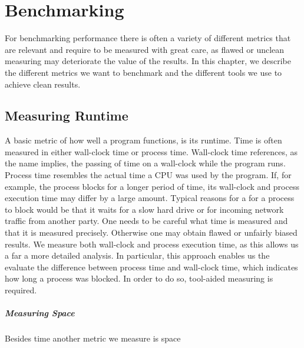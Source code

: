 \chapter{Benchmarking}
For benchmarking performance there is often a variety of different metrics that are relevant and require to be measured with great care, as flawed or unclean measuring may deteriorate the value of the results. In this chapter, we describe the different metrics we want to benchmark and the different tools we use to achieve clean results. 

\section{Measuring Runtime}
A basic metric of how well a program functions, is its runtime. Time is often measured in either wall-clock time or process time. Wall-clock time references, as the name implies, the passing of time on a wall-clock while the program runs. 
Process time resembles the actual time a CPU was used by the program. If, for example, the process blocks for a longer period of time, its wall-clock and process execution time may differ by a large amount. Typical reasons for a for a process to block would be that it waits for a slow hard drive or for incoming network traffic from another party. One needs to be careful what time is measured and that it is measured precisely. Otherwise one may obtain flawed or unfairly biased results. We measure both wall-clock and process execution time, as this allows us a far a more detailed analysis. In particular, this approach enables us the evaluate the difference between process time and wall-clock time, which indicates how long a process was blocked. In order to do so, tool-aided measuring is required.

\paragraph{Measuring Space}
Besides time another metric we measure is space

